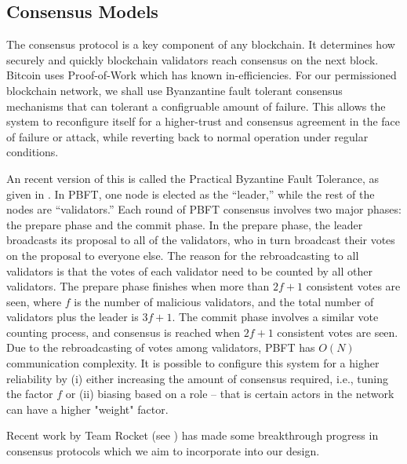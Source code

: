 \subsection{Consensus Models}

The consensus protocol is a key component of any blockchain. It determines how securely and
quickly blockchain validators reach consensus on the next block. Bitcoin uses Proof-of-Work which
has known in-efficiencies. For our permissioned blockchain network, we shall use Byanzantine fault tolerant 
consensus mechanisms that can tolerant a configruable amount of failure. This allows the system
to reconfigure itself for a higher-trust and consensus agreement in the face of failure or attack, while
reverting back to normal operation under regular conditions.

An recent version of this is called the Practical Byzantine Fault Tolerance, as given in \cite{castro1999}. In PBFT, one
node is elected as the “leader,” while the rest of the nodes are “validators.” Each round of PBFT consensus involves two
major phases: the prepare phase and the commit phase. In the prepare phase, the leader broadcasts its proposal to all of
the validators, who in turn broadcast their votes on the proposal to everyone else. The reason for the rebroadcasting to
all validators is that the votes of each validator need to be counted by all other validators. The prepare phase
finishes when more than $2f + 1$ consistent votes are seen, where $f$ is the number of malicious validators, and the
total number of validators plus the leader is $3f + 1$. The commit phase involves a similar vote counting process, and
consensus is reached when $2f + 1$ consistent votes are seen. Due to the rebroadcasting of votes among validators, PBFT
has $O(N)$ communication complexity. It is possible to configure this system for a higher reliability by (i) either
increasing the amount of consensus required, i.e., tuning the factor $f$ or (ii) biasing based on a role -- that is
certain actors in the network can have a higher "weight" factor.

Recent work by Team Rocket (see \cite{ava2018}) has made some breakthrough progress in consensus protocols which we aim
to incorporate into our design.

